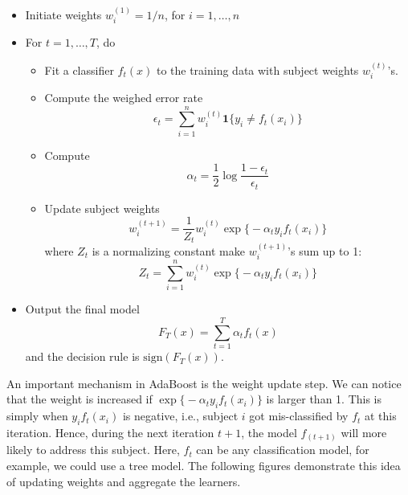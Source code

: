 \documentclass[
]{book}
\providecommand{\tightlist}{%
  \setlength{\itemsep}{0pt}\setlength{\parskip}{0pt}}
\theoremstyle{definition}
\theoremstyle{definition}
\theoremstyle{definition}
\theoremstyle{definition}
\theoremstyle{remark}
\begin{document}
\begin{itemize}
\tightlist
\item
  Initiate weights \(w_i^{(1)} = 1/n\), for \(i = 1, \ldots, n\)
\item
  For \(t = 1, \ldots, T\), do

  \begin{itemize}
  \tightlist
  \item
    Fit a classifier \(f_t(x)\) to the training data with subject weights \(w_i^{(t)}\)'s.
  \item
    Compute the weighed error rate
    \[\epsilon_t = \sum_{i=1}^n w_i^{(t)} \mathbf{1}\{y_i \neq f_t(x_i) \}\]
  \item
    Compute
    \[\alpha_t = \frac{1}{2} \log \frac{1 - \epsilon_t}{\epsilon_t}\]
  \item
    Update subject weights
    \[w_i^{(t + 1)} = \frac{1}{Z_t} w_i^{(t)} \exp\big\{ - \alpha_t y_i f_t(x_i) \big\}\]
    where \(Z_t\) is a normalizing constant make \(w_i^{(t + 1)}\)'s sum up to 1:
    \[Z_t = \sum_{i=1}^n w_i^{(t)} \exp\big\{ - \alpha_t y_i f_t(x_i) \big\}\]
  \end{itemize}
\item
  Output the final model
  \[F_T(x) = \sum_{t = 1}^T \alpha_t f_t(x)\]
  and the decision rule is \(\text{sign}(F_T(x))\).
\end{itemize}

An important mechanism in AdaBoost is the weight update step. We can notice that the weight is increased if \(\exp\big\{ - \alpha_t y_i f_t(x_i) \big\}\) is larger than 1. This is simply when \(y_i f_t(x_i)\) is negative, i.e., subject \(i\) got mis-classified by \(f_t\) at this iteration. Hence, during the next iteration \(t+1\), the model \(f_{(t+1)}\) will more likely to address this subject. Here, \(f_t\) can be any classification model, for example, we could use a tree model. The following figures demonstrate this idea of updating weights and aggregate the learners.
\end{document}
